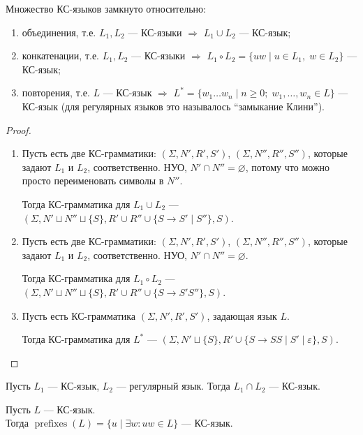 \begin{theorem}
    Множество КС-языков замкнуто относительно:
    \begin{enumerate}
        \item объединения, т.е. $L_1, L_2$ --- КС-языки $\Rightarrow$ $L_1 \cup L_2$ --- КС-язык;
        \item конкатенации, т.е. $L_1, L_2$ --- КС-языки $\Rightarrow$ $L_1 \circ L_2 = \{ uw \mid u \in L_1, \; w \in L_2 \}$ --- КС-язык;
        \item повторения, т.е. $L$ --- КС-язык $\Rightarrow$ $L^* = \{w_1 \dots w_n \mid n \geqslant 0; \; w_1, \dots, w_n \in L \}$ --- КС-язык (для регулярных языков это называлось ``замыкание Клини'').
    \end{enumerate}
\end{theorem}
\begin{proof} $ $

    \begin{enumerate}
        \item Пусть есть две КС-грамматики: $(\Sigma, N', R', S')$, $(\Sigma, N'', R'', S'')$, которые задают $L_1$ и $L_2$, соответственно. НУО, $N' \cap N'' = \varnothing$, потому что можно просто переименовать символы в $N''$. 
        
        Тогда КС-грамматика для $L_1 \cup L_2$ --- $(\Sigma, N' \sqcup N'' \sqcup \{S\}, R' \cup R'' \cup \{ S \to S' \mid S'' \}, S )$. 

        \item Пусть есть две КС-грамматики: $(\Sigma, N', R', S')$, $(\Sigma, N'', R'', S'')$, которые задают $L_1$ и $L_2$, соответственно. НУО, $N' \cap N'' = \varnothing$. 
        
        Тогда КС-грамматика для $L_1 \circ L_2$ --- $(\Sigma, N' \sqcup N'' \sqcup \{S\}, R' \cup R'' \cup \{ S \to S' S'' \}, S )$. 

        \item Пусть есть КС-грамматика $(\Sigma, N', R', S')$, задающая язык $L$.
        
        Тогда КС-грамматика для $L^*$ --- $(\Sigma, N' \sqcup \{S\}, R' \cup \{ S \to S S \mid S' \mid \varepsilon \}, S )$. 
    \end{enumerate}
\end{proof}

\begin{theorem}
    Пусть $L_1$ --- КС-язык, $L_2$ --- регулярный язык. Тогда $L_1 \cap L_2$ --- КС-язык.
\end{theorem}

\begin{theorem}
    Пусть $L$ --- КС-язык. \\ 
    Тогда $\operatorname{prefixes}(L) = \{ u \mid \exists w : uw \in L \}$ --- КС-язык.
\end{theorem}